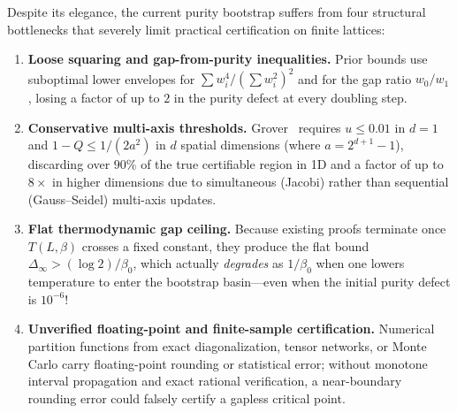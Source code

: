 \documentclass[11pt,a4paper]{article}
\theoremstyle{definition}
\begin{document}
Despite its elegance, the current purity bootstrap suffers from four structural bottlenecks that severely limit practical certification on finite lattices:
\begin{enumerate}[leftmargin=1.6em,itemsep=2pt]
  \item \textbf{Loose squaring and gap-from-purity inequalities.} Prior bounds use suboptimal lower envelopes for $\sum w_i^4 / (\sum w_i^2)^2$ and for the gap ratio $w_0/w_1$, losing a factor of up to $2$ in the purity defect at every doubling step.
  \item \textbf{Conservative multi-axis thresholds.} Grover~\cite{Grover2026Extensions} requires $u \le 0.01$ in $d=1$ and $1 - Q \le 1/(2a^2)$ in $d$ spatial dimensions (where $a = 2^{d+1}-1$), discarding over $90\%$ of the true certifiable region in 1D and a factor of up to $8\times$ in higher dimensions due to simultaneous (Jacobi) rather than sequential (Gauss--Seidel) multi-axis updates.
  \item \textbf{Flat thermodynamic gap ceiling.} Because existing proofs terminate once $T(L,\beta)$ crosses a fixed constant, they produce the flat bound $\Delta_\infty > (\log 2)/\beta_0$, which actually \emph{degrades} as $1/\beta_0$ when one lowers temperature to enter the bootstrap basin—even when the initial purity defect is $10^{-6}$!
  \item \textbf{Unverified floating-point and finite-sample certification.} Numerical partition functions from exact diagonalization, tensor networks, or Monte Carlo carry floating-point rounding or statistical error; without monotone interval propagation and exact rational verification, a near-boundary rounding error could falsely certify a gapless critical point.
\end{enumerate}
\end{document}
